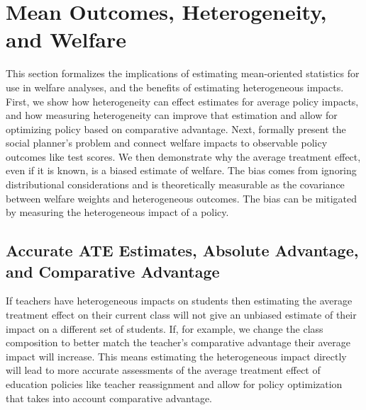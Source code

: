 \documentclass[12pt]{article}
\theoremstyle{definition}
\theoremstyle{definition}
\theoremstyle{definition}
\theoremstyle{definition}
\begin{document}
    
    


\section{Mean Outcomes, Heterogeneity, and Welfare}
\label{theory_setion}


    This section formalizes the implications of estimating mean-oriented statistics for use in welfare analyses, and the benefits of estimating heterogeneous impacts. First, we show how heterogeneity can effect estimates for average policy impacts, and how measuring heterogeneity can improve that estimation and allow for optimizing policy based on comparative advantage. Next, formally present the social planner's problem and connect welfare impacts to observable policy outcomes like test scores. We then demonstrate why the average treatment effect, even if it is known, is a biased estimate of welfare. The bias comes from ignoring distributional considerations and is  theoretically measurable as the covariance between welfare weights and heterogeneous outcomes. The bias can be mitigated by measuring the heterogeneous impact of a policy.
 
    
   \subsection{Accurate ATE Estimates, Absolute Advantage, and Comparative Advantage }

    If teachers have heterogeneous impacts on students then estimating the average treatment effect on their current class will not give an unbiased estimate of their impact on a different set of students. If, for example, we change the class composition to better match the teacher's comparative advantage their average impact will increase. This means estimating the heterogeneous impact directly will lead to more accurate assessments of the average treatment effect of education policies like teacher reassignment and allow for policy optimization that takes into account comparative advantage. 
    
\end{document}
